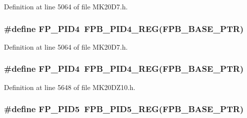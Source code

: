 Definition at line 5064 of file M\+K20\+D7.\+h.

\subsubsection[{\texorpdfstring{F\+P\+\_\+\+P\+I\+D4}{FP_PID4}}]{\setlength{\rightskip}{0pt plus 5cm}\#define F\+P\+\_\+\+P\+I\+D4~{\bf F\+P\+B\+\_\+\+P\+I\+D4\+\_\+\+R\+EG}({\bf F\+P\+B\+\_\+\+B\+A\+S\+E\+\_\+\+P\+TR})}\hypertarget{group___f_p_b___register___accessor___macros_gafc4799598484062cc91fe7765e4491cf}{}\label{group___f_p_b___register___accessor___macros_gafc4799598484062cc91fe7765e4491cf}


Definition at line 5064 of file M\+K20\+D7.\+h.

\subsubsection[{\texorpdfstring{F\+P\+\_\+\+P\+I\+D4}{FP_PID4}}]{\setlength{\rightskip}{0pt plus 5cm}\#define F\+P\+\_\+\+P\+I\+D4~{\bf F\+P\+B\+\_\+\+P\+I\+D4\+\_\+\+R\+EG}({\bf F\+P\+B\+\_\+\+B\+A\+S\+E\+\_\+\+P\+TR})}\hypertarget{group___f_p_b___register___accessor___macros_gafc4799598484062cc91fe7765e4491cf}{}\label{group___f_p_b___register___accessor___macros_gafc4799598484062cc91fe7765e4491cf}


Definition at line 5648 of file M\+K20\+D\+Z10.\+h.

\subsubsection[{\texorpdfstring{F\+P\+\_\+\+P\+I\+D5}{FP_PID5}}]{\setlength{\rightskip}{0pt plus 5cm}\#define F\+P\+\_\+\+P\+I\+D5~{\bf F\+P\+B\+\_\+\+P\+I\+D5\+\_\+\+R\+EG}({\bf F\+P\+B\+\_\+\+B\+A\+S\+E\+\_\+\+P\+TR})}\hypertarget{group___f_p_b___register___accessor___macros_ga190084c874ad19b34e1bf55c690e62d9}{}\label{group___f_p_b___register___accessor___macros_ga190084c874ad19b34e1bf55c690e62d9}


